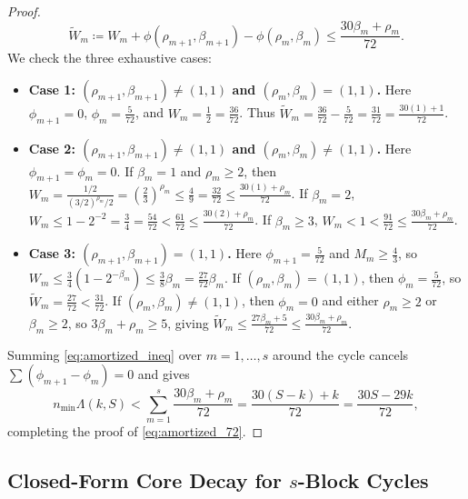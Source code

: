 \documentclass[11pt, a4paper]{amsart}
\theoremstyle{definition}
\begin{document}
\begin{proof}
\begin{equation}\label{eq:amortized_ineq}
\widetilde{W}_m \coloneqq W_m + \phi(\rho_{m+1}, \beta_{m+1}) - \phi(\rho_m, \beta_m) \le \frac{30 \beta_m + \rho_m}{72}.
\end{equation}
We check the three exhaustive cases:
\begin{itemize}
    \item \textbf{Case 1: $(\rho_{m+1}, \beta_{m+1}) \ne (1, 1)$ and $(\rho_m, \beta_m) = (1, 1)$.} Here $\phi_{m+1} = 0$, $\phi_m = \frac{5}{72}$, and $W_m = \frac{1}{2} = \frac{36}{72}$. Thus $\widetilde{W}_m = \frac{36}{72} - \frac{5}{72} = \frac{31}{72} = \frac{30(1) + 1}{72}$.
    \item \textbf{Case 2: $(\rho_{m+1}, \beta_{m+1}) \ne (1, 1)$ and $(\rho_m, \beta_m) \ne (1, 1)$.} Here $\phi_{m+1} = \phi_m = 0$. If $\beta_m = 1$ and $\rho_m \ge 2$, then $W_m = \frac{1/2}{(3/2)^{\rho_m} / 2} = \left(\frac{2}{3}\right)^{\rho_m} \le \frac{4}{9} = \frac{32}{72} \le \frac{30(1) + \rho_m}{72}$. If $\beta_m = 2$, $W_m \le 1 - 2^{-2} = \frac{3}{4} = \frac{54}{72} < \frac{61}{72} \le \frac{30(2) + \rho_m}{72}$. If $\beta_m \ge 3$, $W_m < 1 < \frac{91}{72} \le \frac{30 \beta_m + \rho_m}{72}$.
    \item \textbf{Case 3: $(\rho_{m+1}, \beta_{m+1}) = (1, 1)$.} Here $\phi_{m+1} = \frac{5}{72}$ and $M_m \ge \frac{4}{3}$, so $W_m \le \frac{3}{4}(1 - 2^{-\beta_m}) \le \frac{3}{8}\beta_m = \frac{27}{72}\beta_m$. If $(\rho_m, \beta_m) = (1, 1)$, then $\phi_m = \frac{5}{72}$, so $\widetilde{W}_m = \frac{27}{72} < \frac{31}{72}$. If $(\rho_m, \beta_m) \ne (1, 1)$, then $\phi_m = 0$ and either $\rho_m \ge 2$ or $\beta_m \ge 2$, so $3\beta_m + \rho_m \ge 5$, giving $\widetilde{W}_m \le \frac{27 \beta_m + 5}{72} \le \frac{30 \beta_m + \rho_m}{72}$.
\end{itemize}
Summing \eqref{eq:amortized_ineq} over $m = 1, \dots, s$ around the cycle cancels $\sum (\phi_{m+1} - \phi_m) = 0$ and gives
\[
n_{\min} \Lambda(k, S) < \sum_{m=1}^s \frac{30 \beta_m + \rho_m}{72} = \frac{30(S - k) + k}{72} = \frac{30 S - 29 k}{72},
\]
completing the proof of \eqref{eq:amortized_72}.
\end{proof}

\subsection{Closed-Form Core Decay for $s$-Block Cycles}
\end{document}
